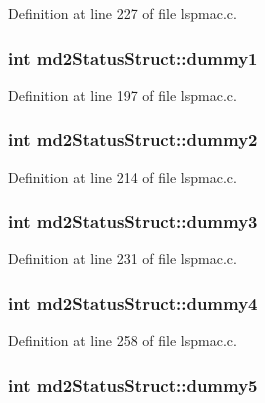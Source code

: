 Definition at line 227 of file lspmac.c.\hypertarget{structmd2StatusStruct_a3a2dff3e6a1a346806a655e8404e0f53}{
\subsubsection[{dummy1}]{\setlength{\rightskip}{0pt plus 5cm}int {\bf md2StatusStruct::dummy1}}}
\label{structmd2StatusStruct_a3a2dff3e6a1a346806a655e8404e0f53}


Definition at line 197 of file lspmac.c.\hypertarget{structmd2StatusStruct_a4df936acc498498baba111edb82597a1}{
\subsubsection[{dummy2}]{\setlength{\rightskip}{0pt plus 5cm}int {\bf md2StatusStruct::dummy2}}}
\label{structmd2StatusStruct_a4df936acc498498baba111edb82597a1}


Definition at line 214 of file lspmac.c.\hypertarget{structmd2StatusStruct_adb2dc5bdbf99def51018558201508009}{
\subsubsection[{dummy3}]{\setlength{\rightskip}{0pt plus 5cm}int {\bf md2StatusStruct::dummy3}}}
\label{structmd2StatusStruct_adb2dc5bdbf99def51018558201508009}


Definition at line 231 of file lspmac.c.\hypertarget{structmd2StatusStruct_adaa01db9cf77d95756bc3156fb702600}{
\subsubsection[{dummy4}]{\setlength{\rightskip}{0pt plus 5cm}int {\bf md2StatusStruct::dummy4}}}
\label{structmd2StatusStruct_adaa01db9cf77d95756bc3156fb702600}


Definition at line 258 of file lspmac.c.\hypertarget{structmd2StatusStruct_af4f8869f8954c6162cae80000c54694f}{
\subsubsection[{dummy5}]{\setlength{\rightskip}{0pt plus 5cm}int {\bf md2StatusStruct::dummy5}}}
\label{structmd2StatusStruct_af4f8869f8954c6162cae80000c54694f}


